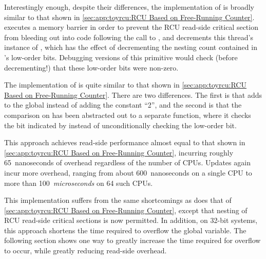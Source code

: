\begin{fcvref}
Interestingly enough, despite their  differences,
the implementation of 
is broadly similar to that shown in
\cref{sec:app:toyrcu:RCU Based on Free-Running Counter}.
 executes a memory barrier
in order to prevent the RCU read-side
critical section from bleeding out into code following the call
to , and
 decrements this thread's instance of ,
which has the effect of decrementing the nesting count contained in
's low-order bits.
Debugging versions of this primitive would check (before decrementing!)
that these low-order bits were non-zero.
\end{fcvref}

\begin{fcvref}
The implementation of  is quite similar to
that shown in
\cref{sec:app:toyrcu:RCU Based on Free-Running Counter}.
There are two differences.
The first is that 
adds  to the global 
instead of adding the constant ``2'',
and the second is that the comparison on 
has been abstracted out to a separate function,
where it checks the bit indicated by 
instead of unconditionally checking the low-order bit.
\end{fcvref}

This approach achieves read-side performance almost equal to that
shown in
\cref{sec:app:toyrcu:RCU Based on Free-Running Counter}, incurring
roughly 65~nanoseconds of overhead regardless of the number of
 CPUs.
Updates again incur more overhead, ranging from about 600~nanoseconds on
a single  CPU to more than 100~\emph{microseconds} on 64
such CPUs.

\QuickQuizEnd

This implementation suffers from the same shortcomings as does that of
\cref{sec:app:toyrcu:RCU Based on Free-Running Counter}, except that
nesting of RCU read-side critical sections is now permitted.
In addition, on 32-bit systems, this approach shortens the time
required to overflow the global  variable.
The following section shows one way to greatly increase the time
required for overflow to occur, while greatly reducing read-side
overhead.

